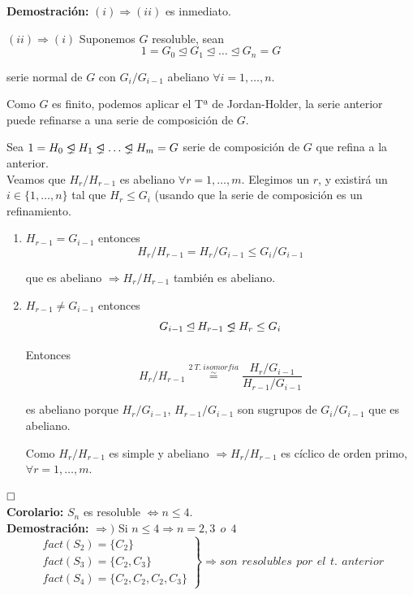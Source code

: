 \documentclass{article}
\newcommand{\unlhdneq}{%
  \mathrel{\ooalign{$\lneq$\cr\raise.22ex\hbox{$\lhd$}\cr}}}
\begin{document}
\textbf{Demostración:} $(i)\Rightarrow (ii)$ es inmediato.

$(ii)\Rightarrow (i)$ Suponemos $G$ resoluble, sean
\begin{equation*}
1=G_0\unlhd G_1\unlhd \ldots \unlhd G_n=G
\end{equation*}

serie normal de $G$ con $G_i/G_{i-1}$ abeliano $\forall i=1,\ldots,n$.

Como $G$ es finito, podemos aplicar el Tª de Jordan-Holder, la serie anterior puede refinarse a una serie de composición de $G$.

Sea $1=H_0\unlhdneq H_1\unlhdneq \ldots\unlhdneq H_m=G$ serie de composición de $G$ que refina a la anterior. \\

Veamos que $H_r/H_{r-1}$ es abeliano $\forall r=1,\ldots,m$. Elegimos un $r$, y existirá un $i\in \{1,\ldots,n\}$ tal que $H_r\leq G_i$ (usando que la serie de composición es un refinamiento.

\begin{enumerate}[\bfseries C{a}so 1]
\item $H_{r-1}=G_{i-1}$ entonces
\begin{equation*}
H_r/H_{r-1}=H_r/G_{i-1}\leq G_i/G_{i-1}
\end{equation*}

que es abeliano $\Rightarrow H_r/H_{r-1}$ también es abeliano.

\item $H_{r-1}\neq G_{i-1}$ entonces
\begin{equation*}
G_{i-1}\unlhd H_{r-1}\unlhdneq H_r\leq G_i
\end{equation*}

Entonces
\begin{equation*}
H_r/H_{r-1}\overset{2\:T.\:isomorfia}{\overset{\sim}{=}} \frac{H_r/G_{i-1}}{H_{r-1}/G_{i-1}}
\end{equation*}

es abeliano porque $H_r/G_{i-1}$, $H_{r-1}/G_{i-1}$ son sugrupos de $G_i/G_{i-1}$ que es abeliano. 

Como $H_r/H_{r-1}$ es simple y abeliano $\Rightarrow H_r/H_{r-1}$ es cíclico de orden primo, $\forall r=1,\ldots,m.$
\end{enumerate}
$\hfill\square$ \\
\textbf{Corolario:} $S_n$ es resoluble $\Leftrightarrow n\leq 4$. \\

\textbf{Demostración:} $\Rightarrow)$ Si $n\leq 4\Rightarrow n=2,3\:\:o\:\:4$
\begin{equation*}
\left. \begin{array}{c}
fact(S_2)=\{C_2\} \\
fact(S_3)=\{C_2,C_3\} \\
fact(S_4)=\{C_2,C_2,C_2,C_3\}
\end{array} \right\rbrace \Rightarrow son\:\,resolubles\:\,por\:\,el\:\,t.\:\,anterior
\end{equation*}
\end{document}
